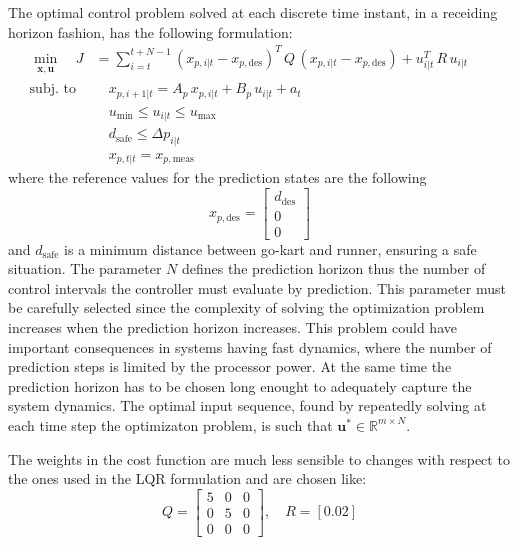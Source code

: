 \documentclass[a4paper,12pt,oneside]{book}
\begin{document}
\bigskip
The optimal control problem solved at each discrete time instant, in a receiding horizon fashion, has the following formulation:
\begin{equation}
\begin{alignedat}{2}
	\min_{\substack{\boldsymbol{x}, \boldsymbol{u}}}\quad J &= \sum_{i=t}^{t+N-1} (x_{p,i|t} - x_{p,\text{des}}) ^T \, Q \, (x_{p,i|t} - x_{p,\text{des}}) +  u_{i|t}^T \, R \, u_{i|t} &&   \\
	\text{subj. to} & \quad x_{p,i+1|t}  = A_p \, x_{p,i|t} + B_p \, u_{i|t} + a_t && \\
    &\quad u_{\text{min}} \leq u_{i|t} \leq u_{\text{max}}&& \\
    &\quad d_{\text{safe}}\leq \Delta p_{i|t} &&  \\
    &\quad x_{p,t|t} = x_{p,\text{meas}} &&
\end{alignedat}
\label{MPC_formulation}
\end{equation}
where the reference values for the prediction states are the following
\begin{equation}
    x_{p,\text{des}} =
    \begin{bmatrix}
        d_{\text{des}}  \\
        0 \\
        0
    \end{bmatrix}
\end{equation}
and $d_{\text{safe}}$ is a minimum distance between go-kart and runner, ensuring a safe situation.
The parameter $N$ defines the prediction horizon thus the number of control intervals the controller must evaluate by prediction. 
This parameter must be carefully selected since the complexity of solving the optimization problem increases when the prediction horizon increases. 
This problem could have important consequences in systems having fast dynamics, where the number of prediction steps is limited by the processor power.
At the same time the prediction horizon has to be chosen long enought to adequately capture the system dynamics.
The optimal input sequence, found by repeatedly solving at each time step the optimizaton problem, is such that $\boldsymbol{u}^* \in \mathbb{R}^{m \times N}$.

The weights in the cost function are much less sensible to changes with respect to the ones used in the LQR formulation and are chosen like:
\begin{equation}
    Q =
    \begin{bmatrix}
        5 & 0 & 0 \\
        0 & 5 & 0 \\
        0 & 0 & 0
    \end{bmatrix},
    \quad
    R = [0.02]    
\end{equation}
\end{document}
